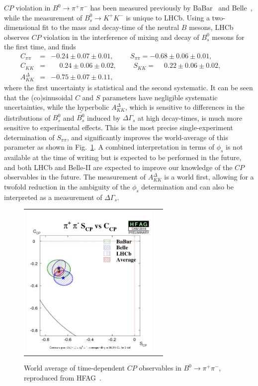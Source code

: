 $CP$ violation in $B^0 \to \pi^+ \pi^-$ has been measured previously by BaBar~\cite{Lees:2012mma} and Belle~\cite{Adachi:2013mae},
while the measurement of $B^0_s \to K^+ K^-$ is unique to LHCb. Using a two-dimensional fit to the mass and decay-time
of the neutral $B$ mesons, LHCb observes $CP$ violation in the interference of mixing and decay of $B^0_s$ mesons for the first time, 
and finds
\begin{eqnarray}
C_{\pi\pi}      &=& -0.24 \pm 0.07 \pm 0.01,\phantom{space}
S_{\pi\pi}      = -0.68 \pm 0.06 \pm 0.01,\phantom{space}
\\
C_{KK}      &=& \phantom{+}0.24 \pm 0.06 \pm 0.02,\phantom{space}
S_{KK}      = \phantom{+}0.22 \pm 0.06 \pm 0.02,\phantom{space}
\\
A^{\Delta}_{KK}      &=& -0.75 \pm 0.07 \pm 0.11,\phantom{space}
\end{eqnarray}
where the first uncertainty is statistical and the second systematic. It can be seen that the (co)sinusoidal $C$ and $S$ parameters have
negligible systematic uncertainties, while the hyperbolic $A^{\Delta}_{KK}$, which is sensitive to differences in the distributions
of $B^0_s$ and $\bar{B^0_s}$ induced by $\Delta\Gamma_s$ at high decay-times, is much more sensitive to experimental effects.
This is the most precise single-experiment
determination of $S_{\pi\pi}$, and significantly improves the world-average of this parameter as shown in Fig.~\ref{b2pipiwahfag}.
A combined interpretation in terms of $\phi_s$ is not available at the time of writing but is expected to be performed
in the future, and both LHCb and Belle-II are expected to improve our knowledge of the $CP$ observables in the future. 
The measurement of $A^{\Delta}_{KK}$ is a world first, allowing for a twofold reduction in the ambiguity of the $\phi_s$ determination
and can also be interpreted as a measurement of $\Delta\Gamma_s$.

\begin{figure}
  \begin{center}
    \begin{tabular}{c c}
      \includegraphics[height=7.5cm]{figs/pi+pi-S_CPvsC_CP.png} &
    \end{tabular}
  \end{center}
  \vspace{-0.5cm}
  \caption{\label{b2pipiwahfag}World average of time-dependent $CP$ observables in $B^0 \to \pi^+ \pi^-$, reproduced from HFAG~\cite{HFAG}.}
\end{figure}
